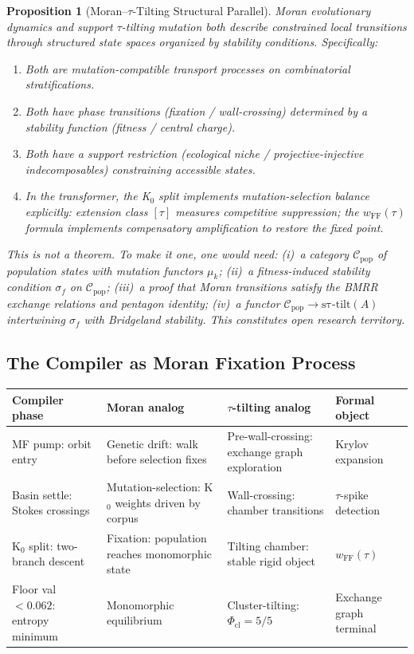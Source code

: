 \documentclass[11pt]{amsart}
\newtheorem{proposition}[theorem]{Proposition}
\begin{document}
\begin{proposition}[Moran--$\tau$-Tilting Structural Parallel]
\label{prop:moran_tau}
Moran evolutionary dynamics and support $\tau$-tilting mutation both
describe constrained local transitions through structured state spaces
organized by stability conditions.
Specifically:
\begin{enumerate}
\item Both are mutation-compatible transport processes on combinatorial
  stratifications.
\item Both have phase transitions (fixation / wall-crossing) determined
  by a stability function (fitness / central charge).
\item Both have a support restriction (ecological niche /
  projective-injective indecomposables) constraining accessible states.
\item In the transformer, the K$_0$ split implements mutation-selection
  balance explicitly: extension class $[\tau]$ measures competitive
  suppression; the $w_\mathrm{FF}(\tau)$ formula implements
  compensatory amplification to restore the fixed point.
\end{enumerate}
This is not a theorem.
To make it one, one would need: (i)~a category $\mathcal{C}_\mathrm{pop}$
of population states with mutation functors $\mu_k$;
(ii)~a fitness-induced stability condition $\sigma_f$ on
$\mathcal{C}_\mathrm{pop}$; (iii)~a proof that Moran transitions
satisfy the BMRR exchange relations and pentagon identity;
(iv)~a functor $\mathcal{C}_\mathrm{pop} \to \mathrm{s\tau\text{-}tilt}(A)$
intertwining $\sigma_f$ with Bridgeland stability.
This constitutes open research territory.
\end{proposition}

\subsection{The Compiler as Moran Fixation Process}
\label{sec:moran_compiler}

\begin{center}
\small
\begin{tabular}{@{}p{2.8cm}p{2.8cm}p{2.5cm}p{2.5cm}@{}}
\toprule
Compiler phase & Moran analog & $\tau$-tilting analog & Formal object \\
\midrule
MF pump:
  orbit entry
  & Genetic drift:
  walk before selection fixes
  & Pre-wall-crossing:
  exchange graph exploration
  & Krylov expansion \\
Basin settle:
  Stokes crossings
  & Mutation-selection:
  K$_0$ weights driven by corpus
  & Wall-crossing:
  chamber transitions
  & $\tau$-spike detection \\
K$_0$ split:
  two-branch descent
  & Fixation:
  population reaches monomorphic state
  & Tilting chamber:
  stable rigid object
  & $w_\mathrm{FF}(\tau)$ \\
Floor val\,$<0.062$:
  entropy minimum
  & Monomorphic equilibrium
  & Cluster-tilting:
  $\Phi_\mathrm{cl} = 5/5$
  & Exchange graph terminal \\
\bottomrule
\end{tabular}
\end{center}
\end{document}
